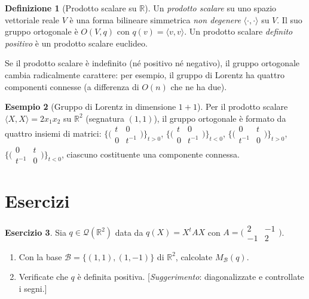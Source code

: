 \documentclass[11pt, a4paper]{book}
\theoremstyle{definition}
\newtheorem{definizione}{Definizione}[section]
\newtheorem{esempio}[definizione]{Esempio}
\newtheorem{esercizio}[definizione]{Esercizio}
\theoremstyle{plain}
\theoremstyle{remark}
\newcommand{\R}{\mathbb{R}}
\begin{document}
\begin{defbox}
\begin{definizione}[Prodotto scalare su $\R$]
Un \emph{prodotto scalare} su uno spazio vettoriale reale $V$ è una forma bilineare simmetrica \emph{non degenere} $\langle\cdot,\cdot\rangle$ su $V$. Il suo gruppo ortogonale è $O(V,q)$ con $q(v) = \langle v,v\rangle$. Un prodotto scalare \emph{definito positivo} è un prodotto scalare euclideo.
\end{definizione}
\end{defbox}

Se il prodotto scalare è indefinito (né positivo né negativo), il gruppo ortogonale cambia radicalmente carattere: per esempio, il gruppo di Lorentz ha quattro componenti connesse (a differenza di $O(n)$ che ne ha due).

\begin{exbox}
\begin{esempio}[Gruppo di Lorentz in dimensione $1+1$]
Per il prodotto scalare $\langle X,X\rangle = 2x_1x_2$ su $\R^2$ (segnatura $(1,1)$), il gruppo ortogonale è formato da quattro insiemi di matrici:
$\bigl\{\bigl(\begin{smallmatrix}t&0\\0&t^{-1}\end{smallmatrix}\bigr)\bigr\}_{t>0}$, $\bigl\{\bigl(\begin{smallmatrix}t&0\\0&t^{-1}\end{smallmatrix}\bigr)\bigr\}_{t<0}$, $\bigl\{\bigl(\begin{smallmatrix}0&t\\t^{-1}&0\end{smallmatrix}\bigr)\bigr\}_{t>0}$, $\bigl\{\bigl(\begin{smallmatrix}0&t\\t^{-1}&0\end{smallmatrix}\bigr)\bigr\}_{t<0}$, ciascuno costituente una componente connessa.
\end{esempio}
\end{exbox}

\section*{Esercizi}
\label{sec:es-cap8}

\begin{esercizio}
Sia $q \in \mathcal{Q}(\R^2)$ data da $q(X) = X^t\!AX$ con $A = \bigl(\begin{smallmatrix}2&-1\\-1&2\end{smallmatrix}\bigr)$.
\begin{enumerate}[label=(\arabic*)]
  \item Con la base $\mathcal{B} = \{(1,1),(1,-1)\}$ di $\R^2$, calcolate $M_\mathcal{B}(q)$.
  \item Verificate che $q$ è definita positiva. [\emph{Suggerimento}: diagonalizzate e controllate i segni.]
\end{enumerate}
\end{esercizio}
\end{document}
